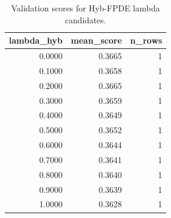 \begin{table}[t]
\caption{Validation scores for Hyb-FPDE lambda candidates.}
\label{tab:lambda_distribution_computed}
\centering
\begin{tabular}{rrr}
\toprule
lambda\_hyb & mean\_score & n\_rows \\
\midrule
0.0000 & 0.3665 & 1 \\
0.1000 & 0.3658 & 1 \\
0.2000 & 0.3665 & 1 \\
0.3000 & 0.3659 & 1 \\
0.4000 & 0.3649 & 1 \\
0.5000 & 0.3652 & 1 \\
0.6000 & 0.3644 & 1 \\
0.7000 & 0.3641 & 1 \\
0.8000 & 0.3640 & 1 \\
0.9000 & 0.3639 & 1 \\
1.0000 & 0.3628 & 1 \\
\bottomrule
\end{tabular}

\end{table}
